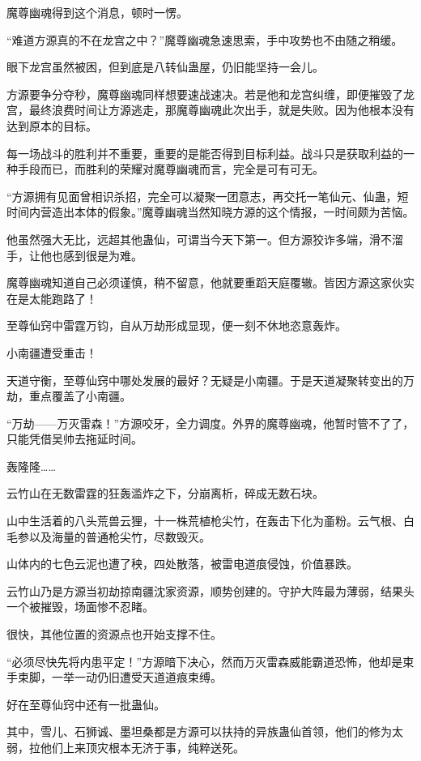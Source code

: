 \begin{this_body}
魔尊幽魂得到这个消息，顿时一愣。

“难道方源真的不在龙宫之中？”魔尊幽魂急速思索，手中攻势也不由随之稍缓。

眼下龙宫虽然被困，但到底是八转仙蛊屋，仍旧能坚持一会儿。

方源要争分夺秒，魔尊幽魂同样想要速战速决。若是他和龙宫纠缠，即便摧毁了龙宫，最终浪费时间让方源逃走，那魔尊幽魂此次出手，就是失败。因为他根本没有达到原本的目标。

每一场战斗的胜利并不重要，重要的是能否得到目标利益。战斗只是获取利益的一种手段而已，而胜利的荣耀对魔尊幽魂而言，完全是可有可无。

“方源拥有见面曾相识杀招，完全可以凝聚一团意志，再交托一笔仙元、仙蛊，短时间内营造出本体的假象。”魔尊幽魂当然知晓方源的这个情报，一时间颇为苦恼。

他虽然强大无比，远超其他蛊仙，可谓当今天下第一。但方源狡诈多端，滑不溜手，让他也感到很是为难。

魔尊幽魂知道自己必须谨慎，稍不留意，他就要重蹈天庭覆辙。皆因方源这家伙实在是太能跑路了！

至尊仙窍中雷霆万钧，自从万劫形成显现，便一刻不休地恣意轰炸。

小南疆遭受重击！

天道守衡，至尊仙窍中哪处发展的最好？无疑是小南疆。于是天道凝聚转变出的万劫，重点覆盖了小南疆。

“万劫——万灭雷森！”方源咬牙，全力调度。外界的魔尊幽魂，他暂时管不了了，只能凭借吴帅去拖延时间。

轰隆隆……

云竹山在无数雷霆的狂轰滥炸之下，分崩离析，碎成无数石块。

山中生活着的八头荒兽云狸，十一株荒植枪尖竹，在轰击下化为齑粉。云气根、白毛参以及海量的普通枪尖竹，尽数毁灭。

山体内的七色云泥也遭了秧，四处散落，被雷电道痕侵蚀，价值暴跌。

云竹山乃是方源当初劫掠南疆沈家资源，顺势创建的。守护大阵最为薄弱，结果头一个被摧毁，场面惨不忍睹。

很快，其他位置的资源点也开始支撑不住。

“必须尽快先将内患平定！”方源暗下决心，然而万灭雷森威能霸道恐怖，他却是束手束脚，一举一动仍旧遭受天道道痕束缚。

好在至尊仙窍中还有一批蛊仙。

其中，雪儿、石狮诚、墨坦桑都是方源可以扶持的异族蛊仙首领，他们的修为太弱，拉他们上来顶灾根本无济于事，纯粹送死。


\end{this_body}
